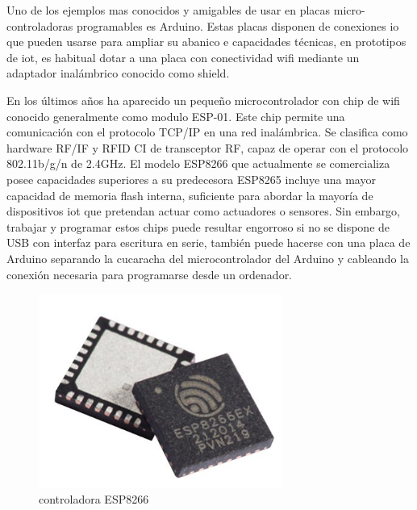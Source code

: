 \vspace{1.5cm}


Uno de los ejemplos mas conocidos y amigables de usar en placas micro-controladoras programables es Arduino. Estas placas disponen de conexiones \gls{io} que pueden usarse para ampliar su abanico e capacidades técnicas, en prototipos de \gls{iot}, es habitual dotar a una placa con conectividad \gls{wifi} mediante un adaptador inalámbrico conocido como shield.

\vspace{1.5cm}

En los últimos años ha aparecido un pequeño microcontrolador con chip de \gls{wifi} conocido generalmente como modulo ESP-01. Este chip permite una comunicación con el protocolo TCP/IP en una red inalámbrica. Se clasifica como hardware RF/IF y RFID CI de transceptor RF, capaz de operar con el protocolo 802.11b/g/n de 2.4GHz. El modelo ESP8266 que actualmente se comercializa posee capacidades superiores a su predecesora ESP8265 incluye una mayor capacidad de memoria flash interna, suficiente para abordar la mayoría de dispositivos \gls{iot} que pretendan actuar como actuadores o sensores.
Sin embargo, trabajar y programar estos chips puede resultar engorroso si no se dispone de USB con interfaz para escritura en serie, también puede hacerse con una placa de Arduino separando la cucaracha del microcontrolador del Arduino y cableando la conexión necesaria para programarse desde un ordenador.

\begin{figure}[hbt!]
\centering
\includegraphics[height=2.5in]{figures/esp8266ex.jpg}
\caption[controladora ESP8233]{controladora ESP8266\footnotemark}
\end{figure}

\vspace{1.5cm}

